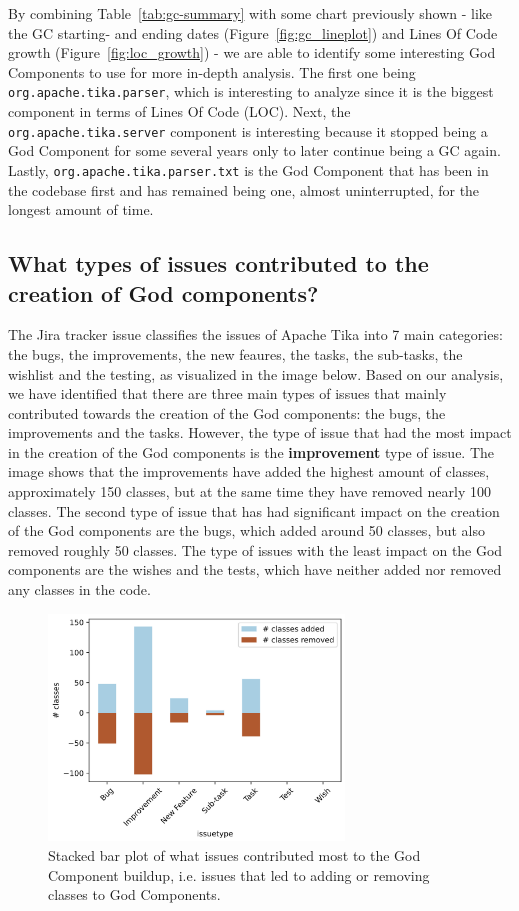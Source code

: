 \documentclass{article}
\begin{document}
By combining Table~\ref{tab:gc-summary} with some chart previously shown - like the GC starting- and ending dates (Figure~\ref{fig:gc_lineplot}) and Lines Of Code growth (Figure~\ref{fig:loc_growth}) - we are able to identify some interesting God Components to use for more in-depth analysis. The first one being \texttt{org.apache.tika.parser}, which is interesting to analyze since it is the biggest component in terms of Lines Of Code (LOC). Next, the \texttt{org.apache.tika.server} component is interesting because it stopped being a God Component for some several years only to later continue being a GC again. Lastly, \texttt{org.apache.tika.parser.txt} is the God Component that has been in the codebase first and has remained being one, almost uninterrupted, for the longest amount of time.



\subsection{What types of issues contributed to the creation of God components?}
 The Jira tracker issue classifies the issues of Apache Tika into 7 main categories: the bugs, the improvements, the new feaures, the tasks, the sub-tasks, the wishlist and the testing, as visualized in the image below. Based on our analysis, we have identified that there are three main types of issues that mainly contributed towards the creation of the God components: the bugs, the improvements and the tasks. However, the type of issue that had the most impact in the creation of the God components is the \textbf{improvement} type of issue. The image shows that the improvements have added the highest amount of classes, approximately 150 classes, but at the same time they have removed nearly 100 classes. The second type of issue that has had significant impact on the creation of the God components are the bugs, which added around 50 classes, but also removed roughly 50 classes. The type of issues with the least impact on the God components are the wishes and the tests, which have neither added nor removed any classes in the code. 
 
\begin{figure}[H]
    \centering
    \includegraphics[width=0.7\textwidth]{report/images/god_components/top-issues.png}
    \caption{Stacked bar plot of what issues contributed most to the God Component buildup, i.e. issues that led to adding or removing classes to God Components.}
    \label{fig:top-issues-plot}
\end{figure}
\end{document}
